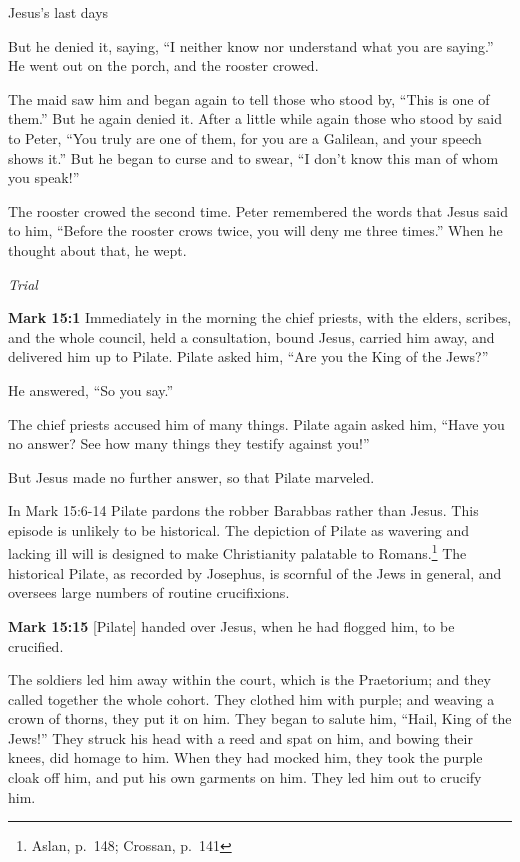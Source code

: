 \documentclass[10pt,twoside]{book}
\newcommand{\quotesize}{\normalsize{}}
\newcommand{\comm}[1]{\begingroup \color{black!50} #1\endgroup}
\newenvironment{quotetext}{\begingroup\quotesize}{\endgroup}
\newcommand{\bible}[2]{\begin{quotetext}\textbf{#1} #2\end{quotetext}}
\newcommand{\gospelmark}[2]{\bible{Mark #1}{#2}}
\newcommand{\subhead}[1]{\emph{#1}\par}
\begin{document}
\begin{section}{Jesus's last days}
{  But he denied it, saying, ``I neither know nor understand what you are saying.'' He went out on the porch, and the rooster crowed.

  The maid saw him and began again to tell those who stood by, ``This is one of them.''   But he again denied it. After a little while again those who stood by said to Peter, ``You truly are one of them, for you are a Galilean, and your speech shows it.''   But he began to curse and to swear, ``I don't know this man of whom you speak!''

  The rooster crowed the second time. Peter remembered the words that Jesus said to him, ``Before the rooster crows twice, you will deny me three times.'' When he thought about that, he wept. 
}

\subhead{Trial}

\gospelmark{15:1}{
Immediately in the morning the chief priests, with the elders, scribes, and the whole council, held a consultation, bound Jesus, carried him away, and delivered him up to Pilate.   Pilate asked him, ``Are you the King of the Jews?''

He answered, ``So you say.''

  The chief priests accused him of many things.   Pilate again asked him, ``Have you no answer? See how many things they testify against you!''

  But Jesus made no further answer, so that Pilate marveled. 
}

\comm{In Mark 15:6-14 Pilate pardons the robber Barabbas rather than Jesus. This episode is unlikely to be historical.
The depiction of Pilate as wavering and lacking ill will is designed to make Christianity palatable to Romans.\footnote{Aslan, p.~148; Crossan,
p.~141} The historical Pilate, as recorded by Josephus, is scornful of the Jews in general, and oversees large numbers
of routine crucifixions.
}

\gospelmark{15:15}{
[Pilate] handed over Jesus, when he had flogged him, to be crucified.

  The soldiers led him away within the court, which is the Praetorium; and they called together the whole cohort.   They clothed him with purple; and weaving a crown of thorns, they put it on him.   They began to salute him, ``Hail, King of the Jews!''   They struck his head with a reed and spat on him, and bowing their knees, did homage to him.   When they had mocked him, they took the purple cloak off him, and put his own garments on him. They led him out to crucify him.

}
\end{section}
\end{document}
